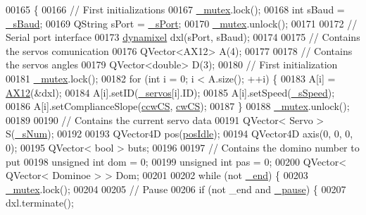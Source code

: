 \begin{DoxyCode}
00165 \{
00166     \textcolor{comment}{// First initializations}
00167     \hyperlink{a00009_a6327eafc0dac189ec1b202d63ef32457}{\_mutex}.lock();
00168     \textcolor{keywordtype}{int} sBaud = \hyperlink{a00009_a5b9a41b9e271275b914affb0a845a2ee}{\_sBaud};
00169     QString sPort = \hyperlink{a00009_ac9a614aa1518efb49b0a06636bd1bdbf}{\_sPort};
00170     \hyperlink{a00009_a6327eafc0dac189ec1b202d63ef32457}{\_mutex}.unlock();
00171     
00172     \textcolor{comment}{// Serial port interface}
00173     \hyperlink{a00004}{dynamixel} dxl(sPort, sBaud);
00174     
00175     \textcolor{comment}{// Contains the servos comunication}
00176     QVector<AX12> A(4);
00177     
00178     \textcolor{comment}{// Contains the servos angles}
00179     QVector<double> D(3);
00180     \textcolor{comment}{// First initialization}
00181     \hyperlink{a00009_a6327eafc0dac189ec1b202d63ef32457}{\_mutex}.lock();
00182     \textcolor{keywordflow}{for} (\textcolor{keywordtype}{int} i = 0; i < A.size(); ++i) \{
00183         A[i] = \hyperlink{a00001}{AX12}(&dxl);  
00184         A[i].setID(\hyperlink{a00009_a1ac6662fe6d198b5971ae0ffa7ddfcfd}{\_servos}[i].ID);
00185         A[i].setSpeed(\hyperlink{a00009_a2591c704c80518be7abb1698364cab5e}{\_sSpeed});
00186         A[i].setComplianceSlope(\hyperlink{a00009_ac2d1087cd0cc45ef71c77aa20b41ceda}{ccwCS}, \hyperlink{a00009_a67b2528edcaa375aefa1fb4117576665}{cwCS});
00187     \}
00188     \hyperlink{a00009_a6327eafc0dac189ec1b202d63ef32457}{\_mutex}.unlock();
00189     
00190     \textcolor{comment}{// Contains the current servo data}
00191     QVector< Servo > S(\hyperlink{a00009_a334e0c5bca9ccb2585cb82bce60ea42f}{\_sNum});
00192     
00193     QVector4D pos(\hyperlink{a00009_a22328f2a08b4a154a275242ee185aebf}{posIdle});
00194     QVector4D axis(0, 0, 0, 0);
00195     QVector< bool > buts;
00196     
00197     \textcolor{comment}{// Contains the domino number to put}
00198     \textcolor{keywordtype}{unsigned} \textcolor{keywordtype}{int} dom = 0;
00199     \textcolor{keywordtype}{unsigned} \textcolor{keywordtype}{int} pas = 0;
00200     QVector< QVector< Dominoe > > Dom;
00201     
00202     \textcolor{keywordflow}{while} (not \hyperlink{a00009_acca9896d1a2d1ef68527e6834f81c76c}{\_end}) \{
00203         \hyperlink{a00009_a6327eafc0dac189ec1b202d63ef32457}{\_mutex}.lock();
00204         
00205         \textcolor{comment}{// Pause}
00206         \textcolor{keywordflow}{if} (not \_end and \hyperlink{a00009_aaf2ef80e8e43518b75d20a5102970d2e}{\_pause}) \{
00207             dxl.terminate();

\end{DoxyCode}
